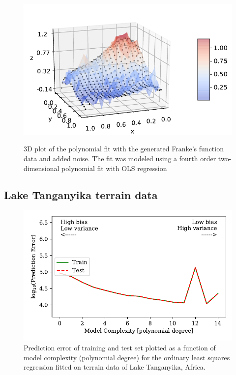 \documentclass[a4paper, 10pt]{article}
\begin{document}
\begin{figure}[H]
	\includegraphics[scale=1]{figs/3dmodel_OLS_Franke.pdf}
	\label{fig:3d_OLS_Franke}
	\caption{3D plot of the polynomial fit with the generated Franke's function data and added noise. The fit was modeled using a fourth order two-dimensional polynomial fit with OLS regression }
\end{figure}




\subsection{Lake Tanganyika terrain data}


\begin{figure}[H]
    \includegraphics[scale=1]{figs/biasvariancetradeoff_ols_terrain.pdf}
    \caption{Prediction error of training and test set plotted as a function of model complexity (polynomial degree) for the ordinary least squares regression  fitted on terrain data of Lake Tanganyika, Africa.}
    \label{fig:bias_ols_terrain}
\end{figure}
\end{document}
